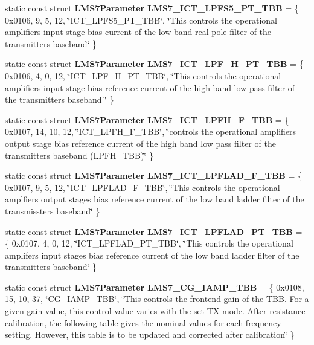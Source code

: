 \begin{DoxyCompactItemize}
\item 
static const struct {\bf L\+M\+S7\+Parameter} {\bf L\+M\+S7\+\_\+\+I\+C\+T\+\_\+\+L\+P\+F\+S5\+\_\+\+P\+T\+\_\+\+T\+BB} = \{ 0x0106, 9, 5, 12, \char`\"{}\+I\+C\+T\+\_\+\+L\+P\+F\+S5\+\_\+\+P\+T\+\_\+\+T\+B\+B\char`\"{}, \char`\"{}\+This controls the operational amplifier\textquotesingle{}s input stage bias current of the low band real pole filter of the transmitter\textquotesingle{}s baseband\char`\"{} \}
\item 
static const struct {\bf L\+M\+S7\+Parameter} {\bf L\+M\+S7\+\_\+\+I\+C\+T\+\_\+\+L\+P\+F\+\_\+\+H\+\_\+\+P\+T\+\_\+\+T\+BB} = \{ 0x0106, 4, 0, 12, \char`\"{}\+I\+C\+T\+\_\+\+L\+P\+F\+\_\+\+H\+\_\+\+P\+T\+\_\+\+T\+B\+B\char`\"{}, \char`\"{}\+This controls the operational amplifiers input stage bias reference current of the high band low pass filter of the transmitter\textquotesingle{}s baseband \char`\"{} \}
\item 
static const struct {\bf L\+M\+S7\+Parameter} {\bf L\+M\+S7\+\_\+\+I\+C\+T\+\_\+\+L\+P\+F\+H\+\_\+\+F\+\_\+\+T\+BB} = \{ 0x0107, 14, 10, 12, \char`\"{}\+I\+C\+T\+\_\+\+L\+P\+F\+H\+\_\+\+F\+\_\+\+T\+B\+B\char`\"{}, \char`\"{}controls the operational amplifiers output stage bias reference current of the high band low pass filter of the transmitter\textquotesingle{}s baseband (\+L\+P\+F\+H\+\_\+\+T\+B\+B)\char`\"{} \}
\item 
static const struct {\bf L\+M\+S7\+Parameter} {\bf L\+M\+S7\+\_\+\+I\+C\+T\+\_\+\+L\+P\+F\+L\+A\+D\+\_\+\+F\+\_\+\+T\+BB} = \{ 0x0107, 9, 5, 12, \char`\"{}\+I\+C\+T\+\_\+\+L\+P\+F\+L\+A\+D\+\_\+\+F\+\_\+\+T\+B\+B\char`\"{}, \char`\"{}\+This controls the operational amplfiers\textquotesingle{} output stages bias reference current of the low band ladder filter of the transmisster\textquotesingle{}s baseband\char`\"{} \}
\item 
static const struct {\bf L\+M\+S7\+Parameter} {\bf L\+M\+S7\+\_\+\+I\+C\+T\+\_\+\+L\+P\+F\+L\+A\+D\+\_\+\+P\+T\+\_\+\+T\+BB} = \{ 0x0107, 4, 0, 12, \char`\"{}\+I\+C\+T\+\_\+\+L\+P\+F\+L\+A\+D\+\_\+\+P\+T\+\_\+\+T\+B\+B\char`\"{}, \char`\"{}\+This controls the operational amplifers\textquotesingle{} input stages bias reference current of the low band ladder filter of the transmitter\textquotesingle{}s baseband\char`\"{} \}
\item 
static const struct {\bf L\+M\+S7\+Parameter} {\bf L\+M\+S7\+\_\+\+C\+G\+\_\+\+I\+A\+M\+P\+\_\+\+T\+BB} = \{ 0x0108, 15, 10, 37, \char`\"{}\+C\+G\+\_\+\+I\+A\+M\+P\+\_\+\+T\+B\+B\char`\"{}, \char`\"{}\+This controls the frontend gain of the T\+B\+B. For a given gain value, this control value varies with the set T\+X mode. After resistance calibration, the following table gives the nominal values for each frequency setting. However, this table is to be updated and corrected after calibration\char`\"{} \}

\end{DoxyCompactItemize}

